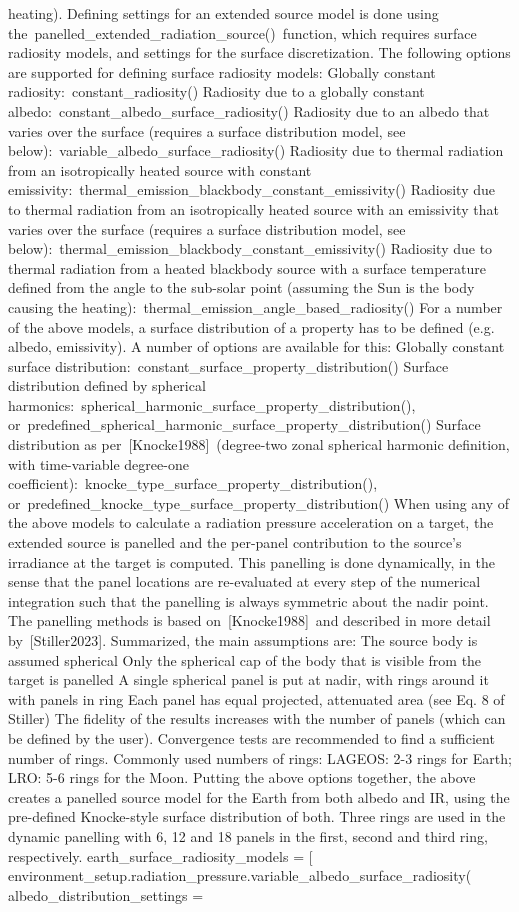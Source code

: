 heating). Defining settings for an extended source model is done using the panelled_extended_radiation_source() function, which requires surface radiosity models, and settings for the surface discretization. The following options are supported for defining surface radiosity models: Globally constant radiosity: constant_radiosity() Radiosity due to a globally constant albedo: constant_albedo_surface_radiosity() Radiosity due to an albedo that varies over the surface (requires a surface distribution model, see below): variable_albedo_surface_radiosity() Radiosity due to thermal radiation from an isotropically heated source with constant emissivity: thermal_emission_blackbody_constant_emissivity() Radiosity due to thermal radiation from an isotropically heated source with an emissivity that varies over the surface (requires a surface distribution model, see below): thermal_emission_blackbody_constant_emissivity() Radiosity due to thermal radiation from a heated blackbody source with a surface temperature defined from the angle to the sub-solar point (assuming the Sun is the body causing the heating): thermal_emission_angle_based_radiosity() For a number of the above models, a surface distribution of a property has to be defined (e.g. albedo, emissivity). A number of options are available for this: Globally constant surface distribution: constant_surface_property_distribution() Surface distribution defined by spherical harmonics: spherical_harmonic_surface_property_distribution(), or predefined_spherical_harmonic_surface_property_distribution() Surface distribution as per [Knocke1988] (degree-two zonal spherical harmonic definition, with time-variable degree-one coefficient): knocke_type_surface_property_distribution(), or predefined_knocke_type_surface_property_distribution() When using any of the above models to calculate a radiation pressure acceleration on a target, the extended source is panelled and the per-panel contribution to the source’s irradiance at the target is computed. This panelling is done dynamically, in the sense that the panel locations are re-evaluated at every step of the numerical integration such that the panelling is always symmetric about the nadir point. The panelling methods is based on [Knocke1988] and described in more detail by [Stiller2023]. Summarized, the main assumptions are: The source body is assumed spherical Only the spherical cap of the body that is visible from the target is panelled A single spherical panel is put at nadir, with rings around it with panels in ring Each panel has equal projected, attenuated area (see Eq. 8 of Stiller) The fidelity of the results increases with the number of panels (which can be defined by the user). Convergence tests are recommended to find a sufficient number of rings. Commonly used numbers of rings: LAGEOS: 2-3 rings for Earth; LRO: 5-6 rings for the Moon. Putting the above options together, the above creates a panelled source model for the Earth from both albedo and IR, using the pre-defined Knocke-style surface distribution of both. Three rings are used in the dynamic panelling with 6, 12 and 18 panels in the first, second and third ring, respectively. earth_surface_radiosity_models = [ environment_setup.radiation_pressure.variable_albedo_surface_radiosity( albedo_distribution_settings = 